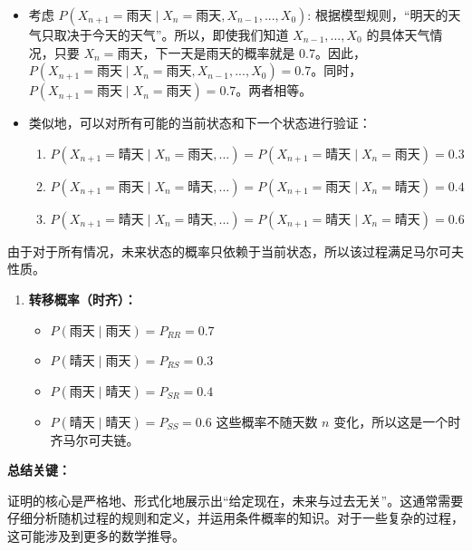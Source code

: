 \begin{itemize}
	\item 考虑 $P(X_{n+1}=\text{雨天} \mid X_n=\text{雨天},X_{n-1},...,X_0)$: 根据模型规则，“明天的天气只取决于今天的天气”。所以，即使我们知道 $X_{n-1},...,X_0$ 的具体天气情况，只要 $X_n=\text{雨天}$，下一天是雨天的概率就是 0.7。因此，$P(X_{n+1}=\text{雨天} \mid X_n=\text{雨天},X_{n-1},...,X_0)=0.7$。同时，$P(X_{n+1}=\text{雨天} \mid X_n=\text{雨天})=0.7$。两者相等。
	\item 类似地，可以对所有可能的当前状态和下一个状态进行验证：
	\begin{enumerate}
		\item $P(X_{n+1}=\text{晴天} \mid X_n=\text{雨天},...) = P(X_{n+1}=\text{晴天} \mid X_n=\text{雨天})=0.3$
		\item $P(X_{n+1}=\text{雨天} \mid X_n=\text{晴天},...) = P(X_{n+1}=\text{雨天} \mid X_n=\text{晴天})=0.4$
		\item $P(X_{n+1}=\text{晴天} \mid X_n=\text{晴天},...) = P(X_{n+1}=\text{晴天} \mid X_n=\text{晴天})=0.6$
	\end{enumerate}
\end{itemize}

由于对于所有情况，未来状态的概率只依赖于当前状态，所以该过程满足马尔可夫性质。

\begin{enumerate}
	\item \textbf{转移概率（时齐）：}
	\begin{itemize}
		\item $P(雨天 \mid 雨天)=P_{RR}=0.7$
		\item $P(晴天 \mid 雨天)=P_{RS}=0.3$
		\item $P(雨天 \mid 晴天)=P_{SR}=0.4$
		\item $P(晴天 \mid 晴天)=P_{SS}=0.6$
这些概率不随天数 $n$ 变化，所以这是一个时齐马尔可夫链。
	\end{itemize}
\end{enumerate}

\textbf{总结关键：}

证明的核心是严格地、形式化地展示出“给定现在，未来与过去无关”。这通常需要仔细分析随机过程的规则和定义，并运用条件概率的知识。对于一些复杂的过程，这可能涉及到更多的数学推导。
